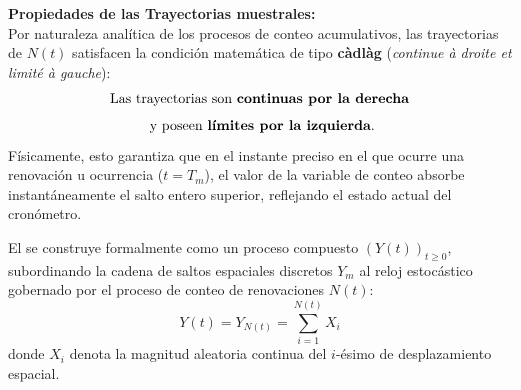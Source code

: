 \begin{minipage}{0.45\textwidth}
\begin{center}
\end{center}
\end{minipage}
\hfill
\begin{minipage}{0.5\textwidth}
    \noindent \textbf{Propiedades de las Trayectorias muestrales:} \\
    Por naturaleza analítica de los procesos de conteo acumulativos, las trayectorias de $N(t)$ satisfacen la condición matemática de tipo \textbf{c\`{a}dl\`{a}g} (\textit{continue \`{a} droite et limit\'{e} \`{a} gauche}):
    \[
    \text{Las trayectorias son \textbf{continuas por la derecha}}
    \]
    \[
    \text{ y poseen \textbf{límites por la izquierda}.}
    \]
    Físicamente, esto garantiza que en el instante preciso en el que ocurre una renovación u ocurrencia ($t = T_m$), el valor de la variable de conteo absorbe instantáneamente el salto entero superior, reflejando el estado actual del cronómetro.
\end{minipage}

\begin{definicion}
    El  se construye formalmente como un proceso compuesto $(Y(t))_{t \ge 0}$, subordinando la cadena de saltos espaciales discretos $Y_m$ al reloj estocástico gobernado por el proceso de conteo de renovaciones $N(t)$:
    \[
    Y(t) = Y_{N(t)} = \sum_{i=1}^{N(t)} X_i
    \]
    donde $X_i$ denota la magnitud aleatoria continua del $i$-ésimo de desplazamiento espacial. \\
\end{definicion}

